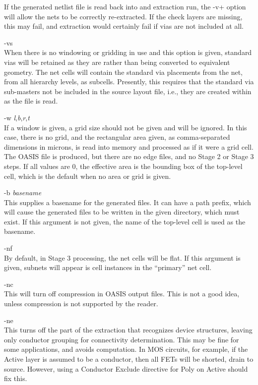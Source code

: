 \begin{description}
If the generated netlist file is read back into {\Xic} and extraction
run, the {\vt -v+} option will allow the nets to be correctly
re-extracted.  If the check layers are missing, this may fail, and
extraction would certainly fail if vias are not included at all.

\item{\vt -vs}\\
When there is no windowing or gridding in use and this option is
given, standard vias will be retained as they are rather than being
converted to equivalent geometry.  The net cells will contain the
standard via placements from the net, from all hierarchy levels, as
subcells.  Presently, this requires that the standard via sub-masters
not be included in the source layout file, i.e., they are created
within {\Xic} as the file is read.

\item{\vt -w} {\it l\/},{\it b\/},{\it r\/},{\it t}\\
If a window is given, a grid size should not be given and will be
ignored.  In this case, there is no grid, and the rectangular area
given, as comma-separated dimensions in microns, is read into memory
and processed as if it were a grid cell.  The OASIS file is produced,
but there are no edge files, and no Stage 2 or Stage 3 steps.  If all
values are 0, the effective area is the bounding box of the top-level
cell, which is the default when no area or grid is given.

\item{\vt -b} {\it basename}\\
This supplies a basename for the generated files.  It can have a path
prefix, which will cause the generated files to be written in the
given directory, which must exist.  If this argument is not given, the
name of the top-level cell is used as the basename.

\item{\vt -nf}\\
By default, in Stage 3 processing, the net cells will be flat.  If
this argument is given, subnets will appear is cell instances in the
``primary'' net cell.

\item{\vt -nc}\\
This will turn off compression in OASIS output files.  This is not a
good idea, unless compression is not supported by the reader.

\item{\vt -ne}\\
This turns off the part of the extraction that recognizes device
structures, leaving only conductor grouping for connectivity
determination.  This may be fine for some applications, and avoids
computation.  In MOS circuits, for example, if the Active layer is
assumed to be a conductor, then all FETs will be shorted, drain to
source.  However, using a {\et Conductor Exclude} directive for Poly
on Active should fix this.


\end{description}

